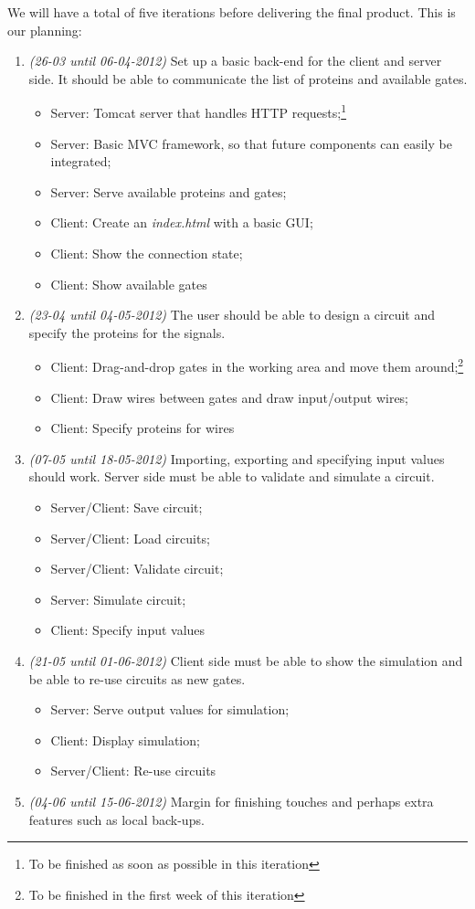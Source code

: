 \documentclass[a4paper]{article}
\begin{document}
\noindent We will have a total of five iterations before delivering the final product. This is our planning:
\begin{enumerate}
\item \emph{(26-03 until 06-04-2012)} Set up a basic back-end for the client and server side. It should be able to communicate the list of proteins and available gates.
	\begin{itemize}
	\item Server: Tomcat server that handles HTTP requests;\footnote[1]{To be finished as soon as possible in this iteration}
	\item Server: Basic MVC framework, so that future components can easily be integrated;\footnotemark[1]
	\item Server: Serve available proteins and gates;
	\item Client: Create an \emph{index.html} with a basic GUI;\footnotemark[1]
	\item Client: Show the connection state;
	\item Client: Show available gates
	\end{itemize}
\item \emph{(23-04 until 04-05-2012)} The user should be able to design a circuit and specify the proteins for the signals.
	\begin{itemize}
	\item Client: Drag-and-drop gates in the working area and move them around;\footnote[2]{To be finished in the first week of this iteration}
	\item Client: Draw wires between gates and draw input/output wires;
	\item Client: Specify proteins for wires
	\end{itemize}
\item \emph{(07-05 until 18-05-2012)} Importing, exporting and specifying input values should work. Server side must be able to validate and simulate a circuit.
	\begin{itemize}
	\item Server/Client: Save circuit;\footnotemark[2]
	\item Server/Client: Load circuits;\footnotemark[2]
	\item Server/Client: Validate circuit;\footnotemark[2]
	\item Server: Simulate circuit;
	\item Client: Specify input values
	\end{itemize}
\item \emph{(21-05 until 01-06-2012)} Client side must be able to show the simulation and be able to re-use circuits as new gates.
	\begin{itemize}
	\item Server: Serve output values for simulation;\footnotemark[2]
	\item Client: Display simulation;
	\item Server/Client: Re-use circuits
	\end{itemize}
\item \emph{(04-06 until 15-06-2012)} Margin for finishing touches and perhaps extra features such as local back-ups.
\end{enumerate}
\end{document}

